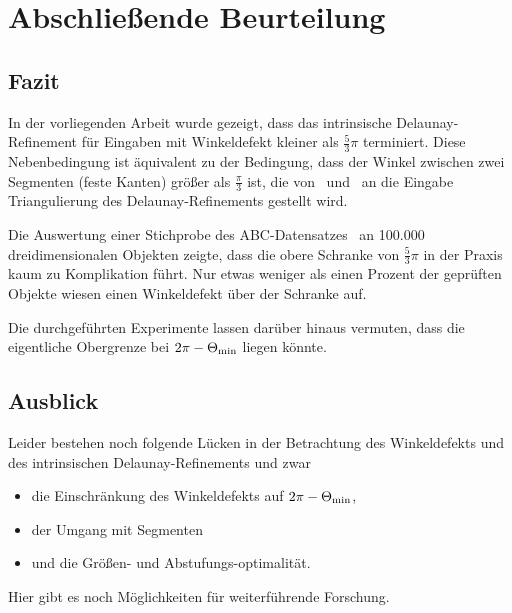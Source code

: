 
\chapter{ Abschließende Beurteilung}
\section*{Fazit}
 
In der vorliegenden Arbeit wurde gezeigt, dass das intrinsische Delaunay-Refinement für Eingaben mit Winkeldefekt kleiner als $\frac{5}{3}\pi$ terminiert.
Diese Nebenbedingung ist äquivalent zu der Bedingung, dass der Winkel zwischen zwei Segmenten (feste Kanten) größer als $\frac{\pi}{3}$ ist, die von~\citeauthor{SHEWCHUK:2002:chuws} und~\citeauthor{ruppert:1995:delaunay} an die Eingabe Triangulierung des Delaunay-Refinements gestellt wird. 

 
Die Auswertung einer Stichprobe des ABC-Datensatzes~\cite{Koch_2019_CVPR} an 100.000 dreidimensionalen Objekten zeigte, dass die obere Schranke von  $\frac{5}{3}\pi$ in der Praxis kaum zu Komplikation führt.  Nur etwas weniger als einen Prozent der geprüften Objekte wiesen einen Winkeldefekt über der Schranke auf.

Die durchgeführten Experimente lassen darüber hinaus vermuten, dass die eigentliche Obergrenze bei $ 2 \pi -  \kleinsterWinkel*$ liegen könnte.


\section*{Ausblick}
Leider bestehen noch folgende Lücken in der Betrachtung des Winkeldefekts und des intrinsischen Delaunay-Refinements und zwar

\begin{itemize}
    \item die  Einschränkung des Winkeldefekts auf $ 2 \pi -  \kleinsterWinkel*$,
    \item der Umgang mit Segmenten
    \item und die Größen- und Abstufungs-optimalität.
\end{itemize} 

 Hier gibt es noch Möglichkeiten für weiterführende Forschung.



